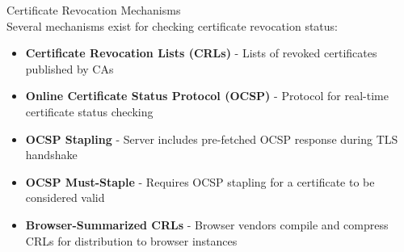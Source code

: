 \begin{concept}{Certificate Revocation Mechanisms}\\
Several mechanisms exist for checking certificate revocation status:
\begin{itemize}
    \item \textbf{Certificate Revocation Lists (CRLs)} - Lists of revoked certificates published by CAs
    \item \textbf{Online Certificate Status Protocol (OCSP)} - Protocol for real-time certificate status checking
    \item \textbf{OCSP Stapling} - Server includes pre-fetched OCSP response during TLS handshake
    \item \textbf{OCSP Must-Staple} - Requires OCSP stapling for a certificate to be considered valid
    \item \textbf{Browser-Summarized CRLs} - Browser vendors compile and compress CRLs for distribution to browser instances
\end{itemize}
\end{concept}

